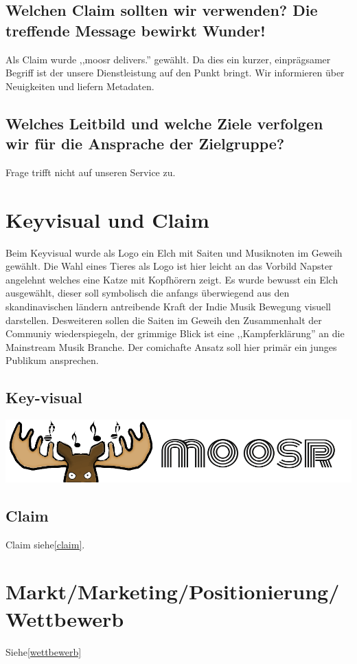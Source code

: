 \documentclass[11pt]{scrreprt}
\begin{document}
\label{claim}\section{Welchen Claim sollten wir verwenden?
Die treffende Message bewirkt Wunder!}

Als Claim wurde ,,moosr delivers.'' gewählt. Da dies ein kurzer, einprägsamer
Begriff ist der unsere Dienstleistung auf den Punkt bringt. Wir informieren über
Neuigkeiten und liefern Metadaten.

\section{Welches Leitbild und welche Ziele verfolgen wir
für die Ansprache der Zielgruppe?}

Frage trifft nicht auf unseren Service zu.

\chapter{Keyvisual und Claim}
Beim Keyvisual wurde als Logo ein Elch mit Saiten und Musiknoten im Geweih
gewählt. Die Wahl eines Tieres als Logo ist hier leicht an das Vorbild Napster
angelehnt welches eine Katze mit Kopfhörern zeigt. Es wurde bewusst ein Elch
ausgewählt, dieser soll symbolisch die anfangs überwiegend aus den
skandinavischen ländern antreibende Kraft der Indie Musik Bewegung visuell
darstellen. Desweiteren sollen die Saiten im Geweih den Zusammenhalt der
Communiy wiederspiegeln, der grimmige Blick ist eine ,,Kampferklärung'' an die
Mainstream Musik Branche. Der comichafte Ansatz soll hier primär ein junges
Publikum ansprechen.
\section{Key-visual}
\includegraphics[scale=0.4]{./elchlogo.png}
\section{Claim}
Claim siehe\ref{claim}.

\chapter{Markt/Marketing/Positionierung/Wettbewerb}
Siehe\ref{wettbewerb}
\end{document}
